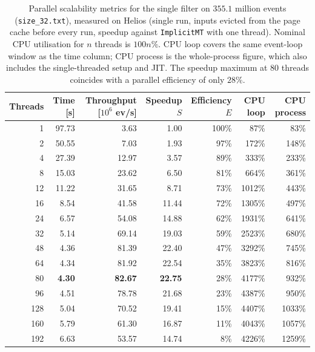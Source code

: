 \begin{table}[htbp]
\centering
\caption{Parallel scalability metrics for the single filter on $355.1$ million events (\texttt{size\_32.txt}), measured on Helios (single run, inputs evicted from the page cache before every run, speedup against \texttt{ImplicitMT} with one thread). Nominal CPU utilisation for $n$ threads is $100n\%$. CPU loop covers the same event-loop window as the time column; CPU process is the whole-process figure, which also includes the single-threaded setup and JIT. The speedup maximum at 80 threads coincides with a parallel efficiency of only $28\%$.}
\label{tab:scalability-filter}
\begin{tabular}{rrrrrrr}
\toprule
Threads & Time [s] & Throughput [$10^6$ ev/s] & Speedup $S$ & Efficiency $E$ & CPU loop & CPU process \\
\midrule
 1 & 97.73 & 3.63 & 1.00 & 100\% & 87\% & 83\% \\
 2 & 50.55 & 7.03 & 1.93 & 97\% & 172\% & 148\% \\
 4 & 27.39 & 12.97 & 3.57 & 89\% & 333\% & 233\% \\
 8 & 15.03 & 23.62 & 6.50 & 81\% & 664\% & 361\% \\
12 & 11.22 & 31.65 & 8.71 & 73\% & 1012\% & 443\% \\
16 & 8.54 & 41.58 & 11.44 & 72\% & 1305\% & 497\% \\
24 & 6.57 & 54.08 & 14.88 & 62\% & 1931\% & 641\% \\
32 & 5.14 & 69.14 & 19.03 & 59\% & 2523\% & 680\% \\
48 & 4.36 & 81.39 & 22.40 & 47\% & 3292\% & 745\% \\
64 & 4.34 & 81.92 & 22.54 & 35\% & 3823\% & 816\% \\
80 & \textbf{4.30} & \textbf{82.67} & \textbf{22.75} & 28\% & 4177\% & 932\% \\
96 & 4.51 & 78.78 & 21.68 & 23\% & 4387\% & 950\% \\
128 & 5.04 & 70.52 & 19.41 & 15\% & 4407\% & 1033\% \\
160 & 5.79 & 61.30 & 16.87 & 11\% & 4043\% & 1057\% \\
192 & 6.63 & 53.57 & 14.74 & 8\% & 4226\% & 1259\% \\
\bottomrule
\end{tabular}
\end{table}
